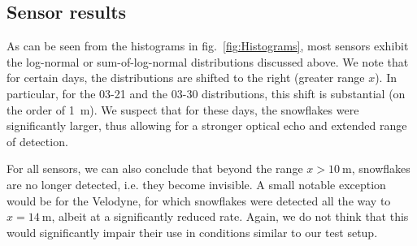  

\subsection{Sensor results}
As can be seen from the histograms in fig.~\ref{fig:Histograms}, most sensors exhibit the log-normal or sum-of-log-normal distributions discussed above. We note that for certain days, the distributions are shifted to the right (greater range $x$). In particular, for the 03-21 and the 03-30 distributions, this shift is substantial (on the order of \SI{1}{\meter}). We suspect that for these days, the snowflakes were significantly larger, thus allowing for a stronger optical echo and extended range of detection. 

For all sensors, we can also conclude that beyond the range $x>\SI{10}{\meter}$, snowflakes are no longer detected, i.e. they become invisible. A small notable exception would be for the Velodyne, for which snowflakes were detected all the way to $x=\SI{14}{\meter}$, albeit at a significantly reduced rate. Again, we do not think that this would significantly impair their use in conditions similar to our test setup. 


